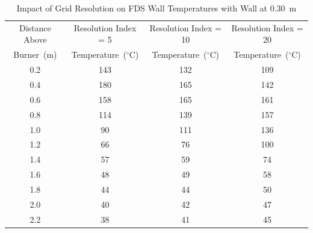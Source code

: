 \documentclass[twoside]{uocthesis}
\begin{document}
\begin{table}
	\small
	\centering
	\begin{tabular}{|c|c|c|c|}
		\hline Distance Above  & Resolution Index = 5      & Resolution Index = 10     & Resolution Index = 20 \\
		Burner~(m)	   & Temperature~($^{\circ}$C) & Temperature~($^{\circ}$C) & Temperature~($^{\circ}$C)	\\ \hline
		\hline 0.2 			   & 143					   & 132					& 109 			 	\\
		\hline 0.4			   & 180					   & 165					& 142			 	\\
		\hline 0.6			   & 158					   & 165					& 161			 	\\
		\hline 0.8			   & 114					   & 139					& 157				\\
		\hline 1.0			   & 90						   & 111 					& 136				\\
		\hline 1.2			   & 66						   & 76 					& 100				\\
		\hline 1.4			   & 57						   & 59 					& 74				\\
		\hline 1.6			   & 48						   & 49 					& 58				\\
		\hline 1.8			   & 44						   & 44 					& 50				\\
		\hline 2.0			   & 40						   & 42 					& 47				\\
		\hline 2.2			   & 38						   & 41 					& 45				\\
		\hline
	\end{tabular}
	\caption[Impact of Grid Resolution on FDS Wall Temperatures with Wall at 0.30~m]{Impact of Grid Resolution on FDS Wall Temperatures with Wall at 0.30~m}
	\label{tab:FDSRI_wall1D}
\end{table}
\end{document}
